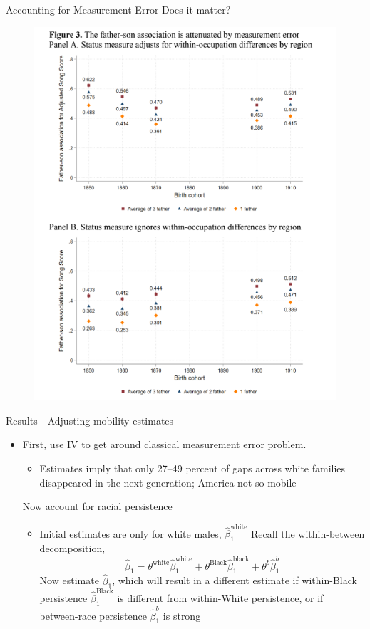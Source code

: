 \documentclass[dvipsnames]{beamer}
\begin{document}
\begin{frame}{Accounting for Measurement Error-Does it matter?}
  \begin{figure}[htp]
    \centering
    \includegraphics[height=0.9\textheight, keepaspectratio=true]{ward_fig3.png}
  \end{figure}
\end{frame}
%
\begin{frame}{Results---Adjusting mobility estimates}
  \begin{itemize}
  \item First, use IV to get around classical measurement error problem.
    \begin{itemize}
    \item Estimates imply that only 27--49 percent of gaps across white families disappeared in the next generation; America not so mobile
    \end{itemize}
  \vitem Now account for racial persistence
    \begin{itemize}
    \item Initial estimates are only for white males, $\hat{\beta}_1^{\text{white}}$
    \vitem Recall the within-between decomposition,
      \[
\hat{\beta}_1 = \theta^\text{white}\hat{\beta}_1^\text{white} + \theta^\text{Black}\hat{\beta}_1^\text{black} + \theta^b  \hat{\beta}^b_1
\]
\vitem Now estimate $\hat{\beta}_1$, which will result in a different estimate if within-Black persistence $\hat{\beta}_1^\text{Black}$ is different from within-White persistence, or if between-race persistence $\hat{\beta}^b_1$ is strong
    \end{itemize}
  \end{itemize}
\end{frame}
\end{document}

